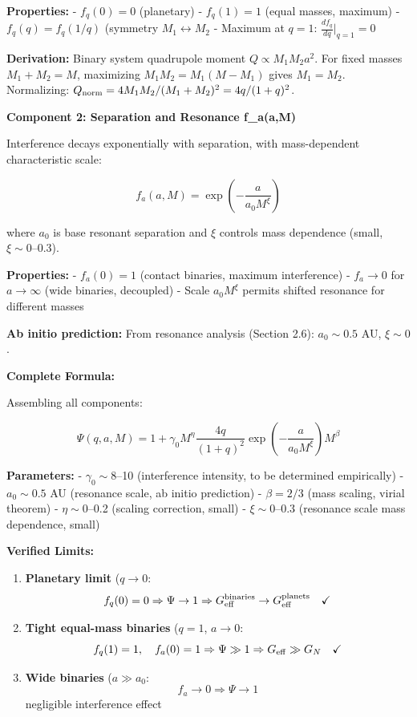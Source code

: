 \documentclass[10pt,a4paper]{article}
\begin{document}
\textbf{Properties:} - \(f_q(0) = 0\) (planetary) - \(f_q(1) = 1\)
(equal masses, maximum) - \(f_q(q) = f_q(1/q)\) (symmetry
\(M_1 \leftrightarrow M_2\) - Maximum at \(q=1\):
\(\frac{df_q}{dq}\Big|_{q=1} = 0\)

\textbf{Derivation:} Binary system quadrupole moment
\(Q \propto M_1 M_2 a^2\). For fixed masses \(M_1+M_2 = M\), maximizing
\(M_1 M_2 = M_1(M-M_1)\) gives \(M_1 = M_2\). Normalizing:
\(Q_{\rm norm} = 4 M_1 M_2/(M_1+M_2)^2 = 4q/(1+q)^2\).

\textbf{Component 2: Separation and Resonance f\_a(a,M)}

Interference decays exponentially with separation, with mass-dependent
characteristic scale:

\[f_a(a,M) = \exp\left(-\frac{a}{a_0 M^\xi}\right)\]

where \(a_0\) is base resonant separation and \(\xi\) controls mass
dependence (small, \(\xi \sim 0\)--0.3).

\textbf{Properties:} - \(f_a(0) = 1\) (contact binaries, maximum
interference) - \(f_a \to 0\) for \(a \to \infty\) (wide binaries,
decoupled) - Scale \(a_0 M^\xi\) permits shifted resonance for different
masses

\textbf{Ab initio prediction:} From resonance analysis (Section 2.6):
\(a_0 \sim 0.5\) AU, \(\xi \sim 0\).

\textbf{Complete Formula:}

Assembling all components:

\[\boxed{\Psi(q,a,M) = 1 + \gamma_0 M^\eta \frac{4q}{(1+q)^2} \exp\left(-\frac{a}{a_0 M^\xi}\right) M^\beta}\]

\textbf{Parameters:} - \(\gamma_0 \sim 8\)--10 (interference intensity,
to be determined empirically) - \(a_0 \sim 0.5\) AU (resonance scale, ab
initio prediction) - \(\beta = 2/3\) (mass scaling, virial theorem) -
\(\eta \sim 0\)--0.2 (scaling correction, small) - \(\xi \sim 0\)--0.3
(resonance scale mass dependence, small)

\textbf{Verified Limits:}

\begin{enumerate}
\def\labelenumi{\arabic{enumi}.}
\item
  \textbf{Planetary limit} (\(q \to 0\):
  \[f_q(0) = 0 \Rightarrow \Psi \to 1 \Rightarrow G_{\rm eff}^{\rm binaries} \to G_{\rm eff}^{\rm planets} \quad \checkmark{}\]
\item
  \textbf{Tight equal-mass binaries} (\(q=1\), \(a \to 0\):
  \[f_q(1) = 1, \quad f_a(0) = 1 \Rightarrow \Psi \gg 1 \Rightarrow G_{\rm eff} \gg G_N \quad \checkmark{}\]
\item
  \textbf{Wide binaries} (\(a \gg a_0\):
  \[f_a \to 0 \Rightarrow \Psi \to 1\] negligible interference effect \checkmark{}
\end{enumerate}
\end{document}
